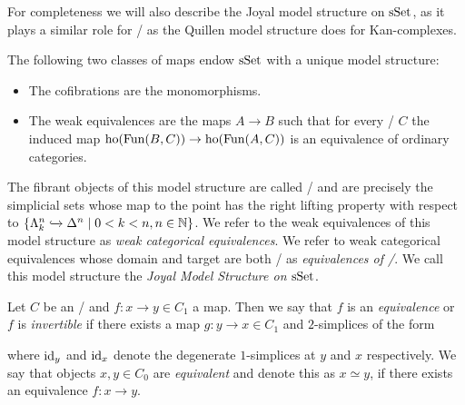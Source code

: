 For completeness we will also describe the Joyal model structure on $\operatorname{sSet}$, as it plays a similar role for \inftycats/ as the Quillen model structure does for Kan-complexes.
\begin{thm}
    The following two classes of maps endow $\operatorname{sSet}$ with a unique model structure:
    \begin{itemize}
        \item The cofibrations are the monomorphisms.
        \item The weak equivalences are the maps $A\to B$ such that for every \inftycat/ $C$ the induced map $\operatorname{ho}(\operatorname{Fun}(B,C))\to\operatorname{ho}(\operatorname{Fun}(A,C))$ is an equivalence of ordinary categories.
    \end{itemize}
    The fibrant objects of this model structure are called \inftycats/ and are precisely the simplicial sets whose map to the point has the right lifting property with respect to $\left\lbrace\Lambda_k^n\xhookrightarrow{}\Delta^n\mid 0< k< n, n\in\mathbb{N}\right\rbrace$.
    We refer to the weak equivalences of this model structure as \emph{weak categorical equivalences}.
    We refer to weak categorical equivalences whose domain and target are both \inftycats/ as \emph{equivalences of \inftycats/}.
    We call this model structure the \emph{Joyal Model Structure on $\operatorname{sSet}$}.
    \begin{reference}
        \cite[Definition 3.3.7, Theorem 3.6.8 and Theorem 3.6.1]{cisinski_2019}
    \end{reference}
\end{thm}
\begin{definition}
    Let $C$ be an \inftycat/ and $f\colon x\to y\in C_1$ a map.
    Then we say that $f$ is an \emph{equivalence} or $f$ is \emph{invertible} if there exists a map $g\colon y\to x\in C_1$ and $2$-simplices of the form
    \begin{center}
    \end{center}
    where $\text{id}_y$ and $\text{id}_x$ denote the degenerate $1$-simplices at $y$ and $x$ respectively.
    We say that objects $x,y\in C_0$ are \emph{equivalent} and denote this as $x\simeq y$, if there exists an equivalence $f\colon x\to y$.
\end{definition}
